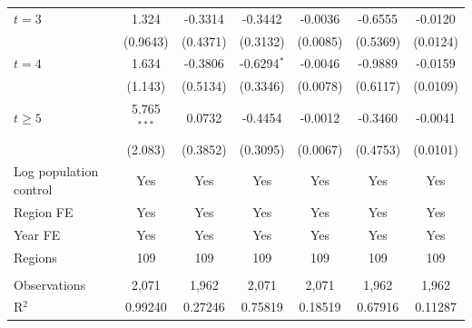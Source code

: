 \begin{tabular}{lcccccc}
   $t = 3$                & 1.324         & -0.3314      & -0.3442       & -0.0036     & -0.6555    & -0.0120\\   
                          & (0.9643)      & (0.4371)     & (0.3132)      & (0.0085)    & (0.5369)   & (0.0124)\\   
   $t = 4$                & 1.634         & -0.3806      & -0.6294$^{*}$ & -0.0046     & -0.9889    & -0.0159\\   
                          & (1.143)       & (0.5134)     & (0.3346)      & (0.0078)    & (0.6117)   & (0.0109)\\   
   $t \geq 5$             & 5.765$^{***}$ & 0.0732       & -0.4454       & -0.0012     & -0.3460    & -0.0041\\   
                          & (2.083)       & (0.3852)     & (0.3095)      & (0.0067)    & (0.4753)   & (0.0101)\\   
   Log population control & Yes           & Yes          & Yes           & Yes         & Yes        & Yes\\  
   Region FE              & Yes           & Yes          & Yes           & Yes         & Yes        & Yes\\  
   Year FE                & Yes           & Yes          & Yes           & Yes         & Yes        & Yes\\  
   Regions                & 109           & 109          & 109           & 109         & 109        & 109\\  
    \\
   Observations           & 2,071         & 1,962        & 2,071         & 2,071       & 1,962      & 1,962\\  
   R$^2$                  & 0.99240       & 0.27246      & 0.75819       & 0.18519     & 0.67916    & 0.11287\\  
   \bottomrule
\end{tabular}
\par\endgroup
